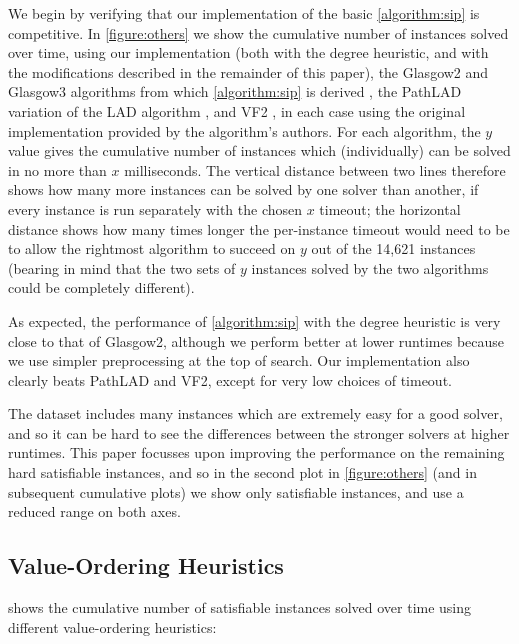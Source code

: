 \documentclass{article}
\newcommand{\citep}[1]{\cite{#1}}
\begin{document}
We begin by verifying that our implementation of the basic \cref{algorithm:sip} is competitive. In
\cref{figure:others} we show the cumulative number of instances solved over time, using our
implementation (both with the degree heuristic, and with the modifications described in the
remainder of this paper), the Glasgow2 and Glasgow3 algorithms from which \cref{algorithm:sip} is derived
\citep{DBLP:conf/cp/McCreeshP15,DBLP:conf/lion/KotthoffMS16}, the PathLAD variation of the LAD
algorithm \citep{DBLP:journals/ai/Solnon10,DBLP:conf/lion/KotthoffMS16}, and VF2
\citep{DBLP:journals/pami/CordellaFSV04}, in each case using the original implementation provided
by the algorithm's authors. For each algorithm, the $y$ value
gives the cumulative number of instances which (individually) can be solved in no more than $x$
milliseconds.  The vertical distance between two lines therefore shows how many more instances can
be solved by one solver than another, if every instance is run separately with the chosen $x$
timeout; the horizontal distance shows how many times longer the per-instance timeout would need to
be to allow the rightmost algorithm to succeed on $y$ out of the 14,621 instances (bearing in mind
that the two sets of $y$ instances solved by the two algorithms could be completely different).

As expected, the performance of \cref{algorithm:sip} with the degree heuristic is very close to that
of Glasgow2, although we perform better at lower runtimes because we use simpler preprocessing at
the top of search. Our implementation also clearly beats PathLAD and VF2, except for very low
choices of timeout.

The dataset includes many instances which are extremely easy for a good solver, and so it can be
hard to see the differences between the stronger solvers at higher runtimes. This paper focusses
upon improving the performance on the remaining hard satisfiable instances, and so in the second
plot in \cref{figure:others} (and in subsequent cumulative plots) we show only satisfiable
instances, and use a reduced range on both axes.

\subsection{Value-Ordering Heuristics}

 shows the cumulative number of satisfiable instances
solved over time using different value-ordering heuristics:
\end{document}
